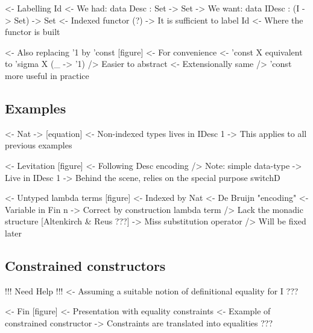 \documentclass{article}
\newenvironment{structure}{\footnotesize\verbatim}{\endverbatim}
\begin{document}
\begin{structure}
<- Labelling Id
    <- We had: data Desc : Set -> Set
    -> We want: data IDesc : (I -> Set) -> Set
        <- Indexed functor (?)
        -> It is sufficient to label Id
            <- Where the functor is built
\end{structure}

\begin{structure}
<- Also replacing '1 by 'const  [figure]
    <- For convenience
        <- 'const X equivalent to 'sigma X (\_ -> '1)
        /> Easier to abstract
            <- Extensionally same
            /> 'const more useful in practice
\end{structure}

\subsection{Examples}

\begin{structure}
<- Nat
    -> [equation]
    <- Non-indexed types lives in IDesc 1
        -> This applies to all previous examples
\end{structure}

\begin{structure}
<- Levitation [figure]
    <- Following Desc encoding
        /> Note: simple data-type
            -> Live in IDesc 1
    -> Behind the scene, relies on the special purpose switchD
\end{structure}

\begin{structure}
<- Untyped lambda terms [figure]
    <- Indexed by Nat
        <- De Bruijn "encoding"
    <- Variable in Fin n
        -> Correct by construction lambda term
    /> Lack the monadic structure [Altenkirch & Reus ???]
        -> Miss substitution operator
        /> Will be fixed later
\end{structure}

\subsection{Constrained constructors}

\begin{structure}
!!! Need Help !!!
<- Assuming a suitable notion of definitional equality for I
    ???
\end{structure}

\begin{structure}
<- Fin [figure]
    <- Presentation with equality constraints
    <- Example of constrained constructor
        -> Constraints are translated into equalities
    ???
\end{structure}
\end{document}
